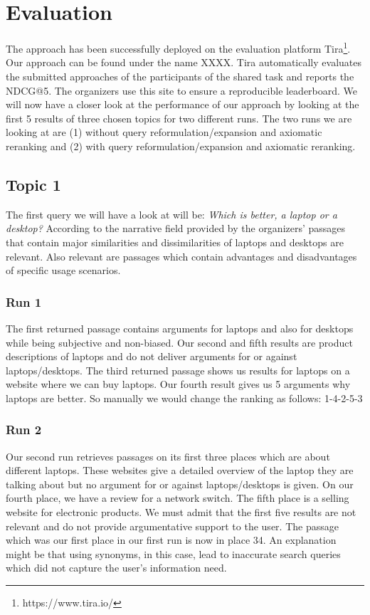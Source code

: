 \section{Evaluation} \label{evaluation}
    The approach has been successfully deployed on the evaluation platform Tira\footnote{https://www.tira.io/}. Our approach can be found under the name XXXX. Tira automatically evaluates the submitted approaches of the participants of the shared task and reports the NDCG@5. The organizers use this site to ensure a reproducible leaderboard. We will now have a closer look at the performance of our approach by looking at the first 5 results of three chosen topics for two different runs. The two runs we are looking at are (1) without query reformulation/expansion and axiomatic reranking and (2) with query reformulation/expansion and axiomatic reranking.
    \subsection{Topic 1}
        The first query we will have a look at will be: \textit{Which is better, a laptop or a desktop?} According to the narrative field provided by the organizers' passages that contain major similarities and dissimilarities of laptops and desktops are relevant. Also relevant are passages which contain advantages and disadvantages of specific usage scenarios.
        \subsubsection*{Run 1}
            The first returned passage contains arguments for laptops and also for desktops while being subjective and non-biased. Our second and fifth results are product descriptions of laptops and do not deliver arguments for or against laptops/desktops. The third returned passage shows us results for laptops on a website where we can buy laptops. Our fourth result gives us 5 arguments why laptops are better. So manually we would  change the ranking as follows: 1-4-2-5-3
        \subsubsection*{Run 2}
            Our second run retrieves passages on its first three places which are about different laptops. These websites give a detailed overview of the laptop they are talking about but no argument for or against laptops/desktops is given. On our fourth place, we have a review for a network switch. The fifth place is a selling website for electronic products. We must admit that the first five results are not relevant and do not provide argumentative support to the user. The passage which was our first place in our first run is now in place 34. An explanation might be that using synonyms, in this case, lead to inaccurate search queries which did not capture the user's information need.

